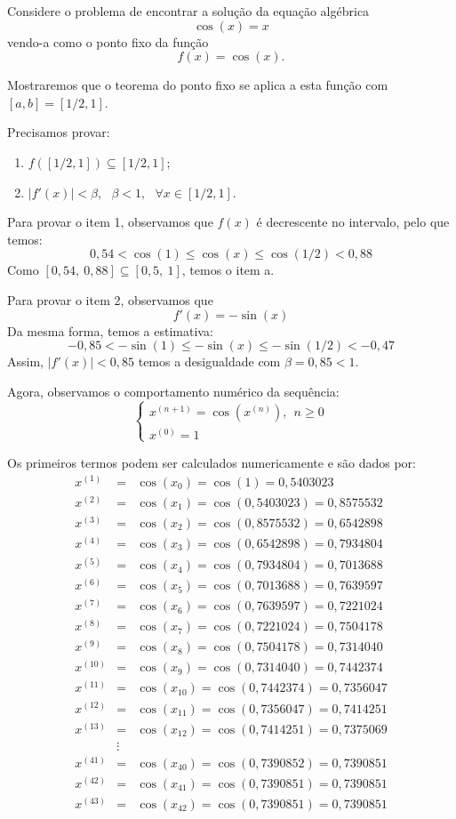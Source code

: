 \documentclass[main.tex]{subfiles}
\begin{document}
\begin{ex}
Considere o problema de encontrar a solução da equação algébrica
$$\cos(x)=x$$
vendo-a como o ponto fixo da função
$$f(x)=\cos(x).$$

Mostraremos que o teorema do ponto fixo se aplica a esta função com $[a,b]=[1/2,1]$.

Precisamos provar:
\begin{enumerate}
\item $f\left([1/2,1]\right) \subseteq [1/2,1]$;
\item $|f'(x)|<\beta,~~~\beta<1,~~~ \forall x\in [1/2,1]$.
\end{enumerate}

Para provar o item 1, observamos que $f(x)$ é decrescente no intervalo, pelo que temos:
$$0,54<\cos(1)\leq \cos(x)\leq \cos(1/2)<0,88$$
Como $[0,54,~0,88]\subseteq [0,5,~1]$, temos o item a.

Para provar o item 2, observamos que
$$f'(x)=-\sin(x)$$
Da mesma forma, temos a estimativa:
$$-0,85<-\sin(1) \leq -\sin(x)\leq -\sin(1/2)<-0,47$$
Assim, $|f'(x)|<0,85$ temos a desigualdade com $\beta=0,85<1$.

Agora, observamos o comportamento numérico da sequência:
$$\left\{\begin{array}{ll}x^{(n+1)}=\cos(x^{(n)}),~~ n\geq 0\\
x^{(0)}=1
\end{array}\right.$$


Os primeiros termos podem ser calculados numericamente e são dados por:
\begin{eqnarray*}
x^{(1)}&=&\cos(x_0)=\cos(1)=0,5403023\\
x^{(2)}&=&\cos(x_1)=\cos(0,5403023)=0,8575532\\
x^{(3)}&=&\cos(x_2)=\cos(0,8575532)=0,6542898\\
x^{(4)}&=&\cos(x_3)=\cos(0,6542898)=0,7934804\\
x^{(5)}&=&\cos(x_4)=\cos(0,7934804)=0,7013688\\
x^{(6)}&=&\cos(x_5)=\cos(0,7013688)=0,7639597\\
x^{(7)}&=&\cos(x_6)=\cos(0,7639597)=0,7221024\\
x^{(8)}&=&\cos(x_7)=\cos(0,7221024)=0,7504178\\
x^{(9)}&=&\cos(x_8)=\cos(0,7504178)=0,7314040\\
x^{(10)}&=&\cos(x_9)=\cos(0,7314040)= 0,7442374  \\
x^{(11)}&=&\cos(x_{10})=\cos(0,7442374)=0,7356047  \\
x^{(12)}&=&\cos(x_{11})=\cos(0,7356047)=0,7414251  \\
x^{(13)}&=&\cos(x_{12})=\cos(0,7414251)=0,7375069  \\
&\vdots&\\
x^{(41)}&=&\cos(x_{40})=\cos(0,7390852)= 0,7390851  \\
x^{(42)}&=&\cos(x_{41})=\cos(0,7390851)= 0,7390851   \\
x^{(43)}&=&\cos(x_{42})=\cos(0,7390851 )= 0,7390851
\end{eqnarray*}
\end{ex}
\end{document}
